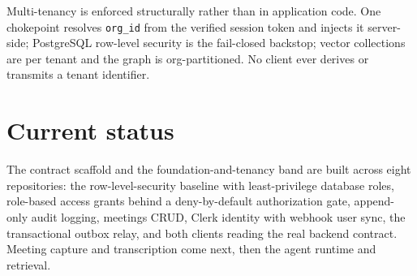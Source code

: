 \documentclass[10pt,a4paper]{article}
\begin{document}
Multi-tenancy is enforced structurally rather than in application code. One
chokepoint resolves \texttt{org\_id} from the verified session token and
injects it server-side; PostgreSQL row-level security is the fail-closed
backstop; vector collections are per tenant and the graph is org-partitioned.
No client ever derives or transmits a tenant identifier.

\section{Current status}

The contract scaffold and the foundation-and-tenancy band are built across
eight repositories: the row-level-security baseline with least-privilege
database roles, role-based access grants behind a deny-by-default authorization
gate, append-only audit logging, meetings CRUD, Clerk identity with webhook
user sync, the transactional outbox relay, and both clients reading the real
backend contract. Meeting capture and transcription come next, then the agent
runtime and retrieval.
\end{document}
